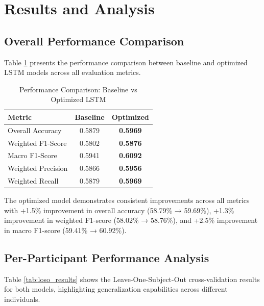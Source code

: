 \documentclass{iopconfser}
\begin{document}
\section{Results and Analysis}

\subsection{Overall Performance Comparison}

Table \ref{tab:performance_comparison} presents the performance comparison between baseline and optimized LSTM models across all evaluation metrics.

\begin{table}[H]
\centering
\caption{Performance Comparison: Baseline vs Optimized LSTM}
\label{tab:performance_comparison}
\begin{tabular}{lcc}
\toprule
\textbf{Metric} & \textbf{Baseline} & \textbf{Optimized} \\
\midrule
Overall Accuracy & 0.5879 & \textbf{0.5969} \\
Weighted F1-Score & 0.5802 & \textbf{0.5876} \\
Macro F1-Score & 0.5941 & \textbf{0.6092} \\
Weighted Precision & 0.5866 & \textbf{0.5956} \\
Weighted Recall & 0.5879 & \textbf{0.5969} \\
\bottomrule
\end{tabular}
\end{table}

The optimized model demonstrates consistent improvements across all metrics with +1.5\% improvement in overall accuracy (58.79\% → 59.69\%), +1.3\% improvement in weighted F1-score (58.02\% → 58.76\%), and +2.5\% improvement in macro F1-score (59.41\% → 60.92\%).

\subsection{Per-Participant Performance Analysis}

Table \ref{tab:loso_results} shows the Leave-One-Subject-Out cross-validation results for both models, highlighting generalization capabilities across different individuals.
\end{document}
